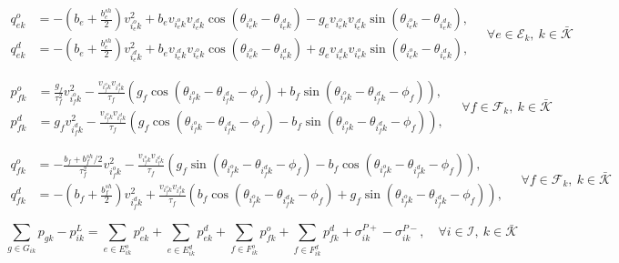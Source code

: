 \documentclass{article}
\begin{document}
\begin{equation}
\begin{aligned}
q_{ek}^o &=
-\left(b_e + \frac{b_e^{sh}}{2}\right) v_{i_e^o k}^2
+ b_e v_{i_e^o k} v_{i_e^d k} \cos(\theta_{i_e^o k} - \theta_{i_e^d k})
- g_e v_{i_e^o k} v_{i_e^d k} \sin(\theta_{i_e^o k} - \theta_{i_e^d k}), \\
q_{ek}^d &=
-\left(b_e + \frac{b_e^{sh}}{2}\right) v_{i_e^d k}^2
+ b_e v_{i_e^d k} v_{i_e^o k} \cos(\theta_{i_e^o k} - \theta_{i_e^d k})
+ g_e v_{i_e^d k} v_{i_e^o k} \sin(\theta_{i_e^o k} - \theta_{i_e^d k}),
\end{aligned}
\quad \forall e \in \mathcal{E}_k,\ k \in \bar{\mathcal{K}}
\tag{2.1d}
\end{equation}

\begin{equation}
\begin{aligned}
p_{fk}^o &=
\frac{g_f}{\tau_f^2} v_{i_f^o k}^2
- \frac{v_{i_f^o k} v_{i_f^d k}}{\tau_f}
\left(
g_f \cos(\theta_{i_f^o k} - \theta_{i_f^d k} - \phi_f)
+ b_f \sin(\theta_{i_f^o k} - \theta_{i_f^d k} - \phi_f)
\right), \\
p_{fk}^d &=
g_f v_{i_f^d k}^2
- \frac{v_{i_f^o k} v_{i_f^d k}}{\tau_f}
\left(
g_f \cos(\theta_{i_f^o k} - \theta_{i_f^d k} - \phi_f)
- b_f \sin(\theta_{i_f^o k} - \theta_{i_f^d k} - \phi_f)
\right),
\end{aligned}
\quad \forall f \in \mathcal{F}_k,\ k \in \bar{\mathcal{K}}
\tag{2.1e}
\end{equation}

\begin{equation}
\begin{aligned}
q_{fk}^o &=
-\frac{b_f + b_f^{sh}/2}{\tau_f^2} v_{i_f^o k}^2
- \frac{v_{i_f^o k} v_{i_f^d k}}{\tau_f}
\left(
g_f \sin(\theta_{i_f^o k} - \theta_{i_f^d k} - \phi_f)
- b_f \cos(\theta_{i_f^o k} - \theta_{i_f^d k} - \phi_f)
\right), \\
q_{fk}^d &=
-\left(b_f + \frac{b_f^{sh}}{2}\right) v_{i_f^d k}^2
+ \frac{v_{i_f^o k} v_{i_f^d k}}{\tau_f}
\left(
b_f \cos(\theta_{i_f^o k} - \theta_{i_f^d k} - \phi_f)
+ g_f \sin(\theta_{i_f^o k} - \theta_{i_f^d k} - \phi_f)
\right),
\end{aligned}
\quad \forall f \in \mathcal{F}_k,\ k \in \bar{\mathcal{K}}
\tag{2.1f}
\end{equation}

\begin{equation}
\sum_{g \in G_{ik}} p_{gk} - p_{ik}^L =
\sum_{e \in E_{ik}^o} p_{ek}^o
+ \sum_{e \in E_{ik}^d} p_{ek}^d
+ \sum_{f \in F_{ik}^o} p_{fk}^o
+ \sum_{f \in F_{ik}^d} p_{fk}^d
+ \sigma_{ik}^{P+} - \sigma_{ik}^{P-},
\quad \forall i \in \mathcal{I},\ k \in \bar{\mathcal{K}}
\tag{2.1g}
\end{equation}
\end{document}

